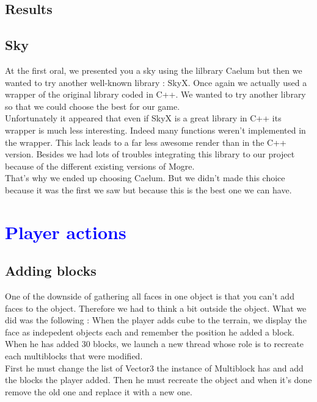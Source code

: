 \documentclass[article]{report}             %
\begin{document}
			\section{Results}
			
			\section{Sky}
				At the first oral, we presented you a sky using the lilbrary Caelum but then we wanted to try another well-known library : SkyX. Once again we actually used a wrapper of the original library coded in C++. We wanted to try another library so that we could choose the best for our game.\\
				
Unfortunately it appeared that even if SkyX is a great library in C++ its wrapper is much less interesting. Indeed many functions weren't implemented in the wrapper. This lack leads to a far less awesome render than in the C++ version. Besides we had lots of troubles integrating this library to our project because of the different existing versions of Mogre.\\

That's why we ended up choosing Caelum. But we didn't made this choice because it was the first we saw but because this is the best one we can have.

		\chapter{\textcolor{blue}{Player actions}}
			\section{Adding blocks}
				One of the downside of gathering all faces in one object is that you can't add faces to the object. Therefore we had to think a bit outside the object. What we did was the following : When the player adds cube to the terrain, we display the face as indepedent objects each and remember the position he added a block. When he has added 30 blocks, we launch a new thread whose role is to recreate each multiblocks that were modified.\\

		First he must change the list of Vector3 the instance of Multiblock has and add the blocks the player added. Then he must recreate the object and when it's done remove the old one and replace it with a new one.\\
\end{document}
